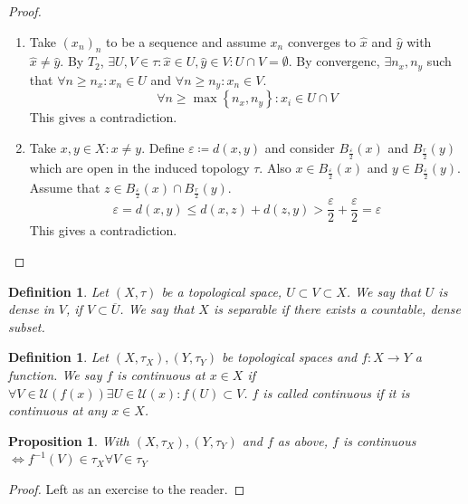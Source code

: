 \documentclass[a4paper]{article}
\newcounter{lecref}[section]
\numberwithin{lecref}{section}
\newtheorem{definition}[lecref]{Definition}
\newtheorem{proposition}[lecref]{Proposition}
\newcommand{\Set}[1]{\left\{#1\right\}}
\begin{document}
\begin{proof}
	\begin{enumerate}
		\item
			Take $(x_n)_n$ to be a sequence and assume $x_n$ converges to $\hat x$ and $\hat y$ with $\hat x \neq \hat y$. By $T_2$, $\exists U, V \in \tau: \hat x \in U, \hat y \in V: U \cap V = \emptyset$.
			By convergenc, $\exists n_x, n_y$ such that $\forall n \geq n_x: x_n \in U$ and $\forall n \geq n_y: x_n \in V$.
			\[ \forall n \geq \max\Set{n_x, n_y}: x_i \in U \cap V \]
			This gives a contradiction.
		\item
			Take $x, y \in X: x \neq y$. Define $\varepsilon \coloneqq d(x, y)$ and consider $B_{\frac{\varepsilon}{2}}(x)$ and $B_{\frac r2}(y)$ which are open in the induced topology $\tau$. Also $x \in B_{\frac\varepsilon2}(x)$ and $y \in B_{\frac\varepsilon2}(y)$. Assume that $z \in B_{\frac\varepsilon2}(x) \cap B_{\frac r2}(y)$.
			\[ \varepsilon = d(x, y) \leq d(x, z) + d(z, y) > \frac\varepsilon2 + \frac\varepsilon2 = \varepsilon \]
			This gives a contradiction.
	\end{enumerate}
\end{proof}

\begin{definition}
	\label{definition:1.9}
	Let $(X, \tau)$ be a topological space, $U \subset V \subset X$.
	We say that $U$ is \emph{dense} in $V$, if $V \subset \overline U$.
	We say that $X$ is \emph{separable} if there exists a countable, dense subset.
\end{definition}

\begin{definition}
	\label{definition:1.10}
	Let $(X, \tau_X), (Y, \tau_Y)$ be topological spaces and $f: X \to Y$ a function. We say $f$ is \emph{continuous} at $x \in X$ if $\forall V \in \mathcal U(f(x)) \exists U \in \mathcal U(x): f(U) \subset V$.
	$f$ is called \emph{continuous} if it is continuous at any $x \in X$.
\end{definition}

\begin{proposition}
	\label{proposition:1.11}
	With $(X, \tau_X), (Y, \tau_Y)$ and $f$ as above,
	$f$ is continuous $\iff f^{-1}(V) \in \tau_X \forall V \in \tau_Y$
\end{proposition}
\begin{proof}
	Left as an exercise to the reader.
\end{proof}
\end{document}
